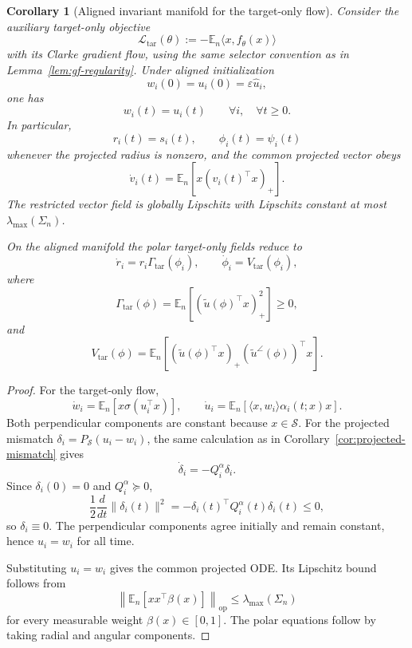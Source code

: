 \documentclass{article} %
\theoremstyle{plain}
\newtheorem{corollary}[theorem]{Corollary}
\theoremstyle{definition}
\theoremstyle{remark}
\begin{document}
\begin{corollary}[Aligned invariant manifold for the target-only flow]
\label{cor:target-only-aligned-manifold}
Consider the auxiliary target-only objective
\[
\mathcal L_{\mathrm{tar}}(\theta)
:=
-\mathbb E_n\langle x,f_\theta(x)\rangle
\]
with its Clarke gradient flow, using the same selector convention as in
Lemma~\ref{lem:gf-regularity}.  Under aligned initialization
\[
w_i(0)=u_i(0)=\varepsilon\widehat u_i,
\]
one has
\[
\boxed{
w_i(t)=u_i(t)
}
\qquad
\forall i,
\quad
\forall t\ge0.
\]
In particular,
\[
\boxed{
r_i(t)=s_i(t),
\qquad
\phi_i(t)=\psi_i(t)
}
\]
whenever the projected radius is nonzero, and the common projected vector
obeys
\[
\boxed{
\dot v_i(t)
=
\mathbb E_n
\left[
x(v_i(t)^\top x)_+
\right].
}
\]
The restricted vector field is globally Lipschitz with Lipschitz constant at
most $\lambda_{\max}(\Sigma_n)$.

On the aligned manifold the polar target-only fields reduce to
\[
\boxed{
\dot r_i
=
r_i\Gamma_{\mathrm{tar}}(\phi_i),
\qquad
\dot\phi_i
=
V_{\mathrm{tar}}(\phi_i),
}
\]
where
\[
\Gamma_{\mathrm{tar}}(\phi)
=
\mathbb E_n
\left[
(\widetilde u(\phi)^\top x)_+^2
\right]
\ge0,
\]
and
\[
V_{\mathrm{tar}}(\phi)
=
\mathbb E_n
\left[
(\widetilde u(\phi)^\top x)_+
(\widetilde u^\angle(\phi))^\top x
\right].
\]
\end{corollary}

\begin{proof}
For the target-only flow,
\[
\dot w_i
=
\mathbb E_n
\left[
x\sigma(u_i^\top x)\right],
\qquad
\dot u_i
=
\mathbb E_n
\left[
\langle x,w_i\rangle\alpha_i(t;x)x
\right].
\]
Both perpendicular components are constant because $x\in\mathcal S$.
For the projected mismatch $\delta_i=P_{\mathcal S}(u_i-w_i)$, the same
calculation as in Corollary~\ref{cor:projected-mismatch} gives
\[
\dot\delta_i
=
-Q_i^\alpha\delta_i.
\]
Since $\delta_i(0)=0$ and $Q_i^\alpha\succeq0$,
\[
\frac12\frac{d}{dt}\|\delta_i(t)\|^2
=
-\delta_i(t)^\top Q_i^\alpha(t)\delta_i(t)
\le0,
\]
so $\delta_i\equiv0$.  The perpendicular components agree initially and remain
constant, hence $u_i=w_i$ for all time.

Substituting $u_i=w_i$ gives the common projected ODE.  Its Lipschitz bound
follows from
\[
\left\|
\mathbb E_n
\left[
xx^\top\beta(x)
\right]
\right\|_{\mathrm{op}}
\le
\lambda_{\max}(\Sigma_n)
\]
for every measurable weight $\beta(x)\in[0,1]$.  The polar equations follow
by taking radial and angular components.
\end{proof}
\end{document}
